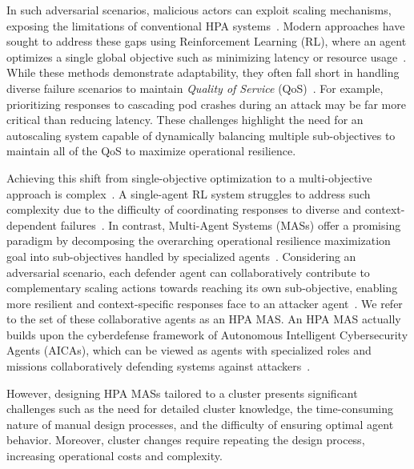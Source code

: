 \documentclass[conference]{IEEEtran}
\begin{document}
In such adversarial scenarios, malicious actors can exploit scaling mechanisms, exposing the limitations of conventional HPA systems~\cite{Kim2020}. Modern approaches have sought to address these gaps using Reinforcement Learning (RL), where an agent optimizes a single global objective such as minimizing latency or resource usage~\cite{Nguyen2019}. While these methods demonstrate adaptability, they often fall short in handling diverse failure scenarios to maintain \textit{Quality of Service} (QoS)~\cite{Castro2020}. For example, prioritizing responses to cascading pod crashes during an attack may be far more critical than reducing latency. These challenges highlight the need for an autoscaling system capable of dynamically balancing multiple sub-objectives to maintain all of the QoS to maximize operational resilience.

Achieving this shift from single-objective optimization to a multi-objective approach is complex~\cite{Shoham2008}. A single-agent RL system struggles to address such complexity due to the difficulty of coordinating responses to diverse and context-dependent failures~\cite{Jennings1998}. In contrast, Multi-Agent Systems (MASs) offer a promising paradigm by decomposing the overarching operational resilience maximization goal into sub-objectives handled by specialized agents~\cite{Shoham2008}. Considering an adversarial scenario, each defender agent can collaboratively contribute to complementary scaling actions towards reaching its own sub-objective, enabling more resilient and context-specific responses face to an attacker agent~\cite{Jennings1998}. We refer to the set of these collaborative agents as an HPA MAS. An HPA MAS actually builds upon the cyberdefense framework of Autonomous Intelligent Cybersecurity Agents (AICAs), which can be viewed as agents with specialized roles and missions collaboratively defending systems against attackers~\cite{Kott2018}.

However, designing HPA MASs tailored to a cluster presents significant challenges such as the need for detailed cluster knowledge, the time-consuming nature of manual design processes, and the difficulty of ensuring optimal agent behavior. Moreover, cluster changes require repeating the design process, increasing operational costs and complexity.
\end{document}
